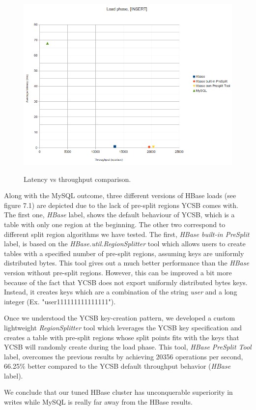 \begin{figure}[htb]
\centering
\includegraphics[width=1\textwidth]{./images/load.png}
 \label{fig:load}
\caption{Latency vs throughput comparison.}
\end{figure}


Along with the MySQL outcome, three different versions of HBase loads (see figure 7.1) are depicted due to the lack of pre-split regions YCSB comes with. The first one, \textit{HBase} label, shows the default behaviour of YCSB, which is a table with only one region at the beginning. The other two correspond to different split region algorithms we have tested. The first, \textit{HBase built-in PreSplit} label, is based on the \textit{HBase.util.RegionSplitter} tool which allows users to create tables with a specified number of pre-split regions, assuming keys are uniformly distributed bytes. This tool gives out a much better performance than the \textit{HBase} version without pre-split regions. However, this can be improved a bit more because of the fact that YCSB does not export uniformly distributed bytes keys. Instead, it creates keys which are a combination of the string \textit{user} and a long integer (Ex. "user111111111111111").
\par
Once we understood the YCSB key-creation pattern, we developed a custom lightweight \textit{RegionSplitter} tool which leverages the YCSB key specification and creates a table with pre-split regions whose split points fits with the keys that YCSB will randomly create during the load phase. This tool, \textit{HBase PreSplit Tool} label, overcomes the previous results by achieving 20356 operations per second,  66.25\% better compared to the YCSB default throughput behavior (\textit{HBase} label). 
\par
We conclude that our tuned HBase cluster has unconquerable superiority in writes while MySQL is really far away from the HBase results.



